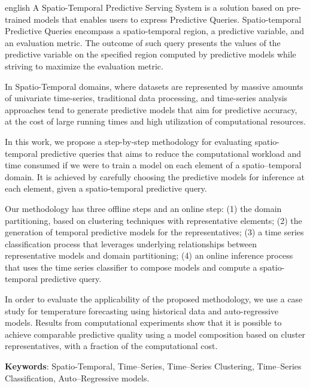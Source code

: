 \documentclass[
	final,				%
	12pt,				%
	openright,			%
	oneside,			%
	a4paper,			%
	hyphens,            %
	sumario=tradicional,%
	english,			%
	french,				%
	spanish,			%
	brazil				%
	]{abntex2}
\begin{document}
\begin{resumo}[Abstract]
 \begin{otherlanguage*}{english}
A Spatio-Temporal Predictive Serving System is a solution based on pre-trained models that enables users to express Predictive Queries. Spatio-temporal Predictive Queries encompass a spatio-temporal region, a predictive variable, and an evaluation metric. The outcome of such query presents the values of the predictive variable on the specified region computed by predictive models while striving to maximize the evaluation metric.
 
 In Spatio-Temporal domains, where datasets are represented by massive amounts of univariate time-series, traditional data processing, and time-series analysis approaches tend to generate predictive models that aim for predictive accuracy, at the cost of large running times and high utilization of computational resources.

 In this work, we propose a step-by-step methodology for evaluating spatio-temporal predictive queries that aims to reduce the computational workload and time consumed if we were to train a model on each element of a spatio–temporal domain.  It is achieved by carefully choosing the predictive models for inference at each element, given a spatio-temporal predictive query.
 
 Our methodology has three offline steps and an online step: (1) the domain partitioning, based on clustering techniques with representative elements; (2) the generation of temporal predictive models for the representatives; (3) a time series classification process that leverages underlying relationships between representative models and domain partitioning; (4) an online inference process that uses the time series classifier to compose models and compute a spatio-temporal predictive query.
 
 In order to evaluate the applicability of the proposed methodology, we use a case study for temperature forecasting using historical data and auto-regressive models. Results from computational experiments show that it is possible to achieve comparable predictive quality using a model composition based on cluster representatives, with a fraction of the computational cost. 
 
   \textbf{Keywords}: Spatio-Temporal, Time--Series, Time--Series Clustering, Time--Series Classification, Auto--Regressive models.
 \end{otherlanguage*}
\end{resumo}
\end{document}
